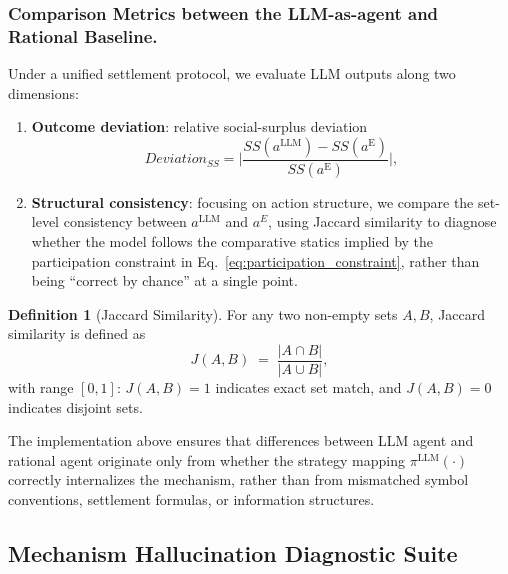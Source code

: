 \documentclass[sigconf,anonymous,review]{acmart}
\theoremstyle{definition}
\newtheorem{definition}{Definition}
\begin{document}
\subsubsection{Comparison Metrics between the LLM-as-agent and Rational Baseline.}
Under a unified settlement protocol, we evaluate LLM outputs along two dimensions:
\begin{enumerate}
\item \textbf{Outcome deviation}: relative social-surplus deviation
\begin{equation}
Deviation_{SS} = \lvert \frac{SS(a^{\text{LLM}})-SS(a^{\text{E}})}{SS(a^{\text{E}})}\rvert,
\end{equation}
\item \textbf{Structural consistency}: focusing on action structure, we compare the set-level consistency between \(a^{\mathrm{LLM}}\) and \(a^{E}\), using Jaccard similarity to diagnose whether the model follows the comparative statics implied by the participation constraint in Eq.~\eqref{eq:participation_constraint}, rather than being ``correct by chance'' at a single point.
\end{enumerate}

\begin{definition}[Jaccard Similarity]
For any two non-empty sets \(A,B\), Jaccard similarity is defined as
\begin{equation}
J(A,B) \;=\; \frac{|A\cap B|}{|A\cup B|},
\end{equation}
with range \([0,1]\): \(J(A,B)=1\) indicates exact set match, and \(J(A,B)=0\) indicates disjoint sets.
\end{definition}

The implementation above ensures that differences between LLM agent and rational agent originate only from whether the strategy mapping \(\pi^{\mathrm{LLM}}(\cdot)\) correctly internalizes the mechanism, rather than from mismatched symbol conventions, settlement formulas, or information structures.


\subsection{Mechanism Hallucination Diagnostic Suite}
\label{subsec:part3_diagnosis}
\end{document}
